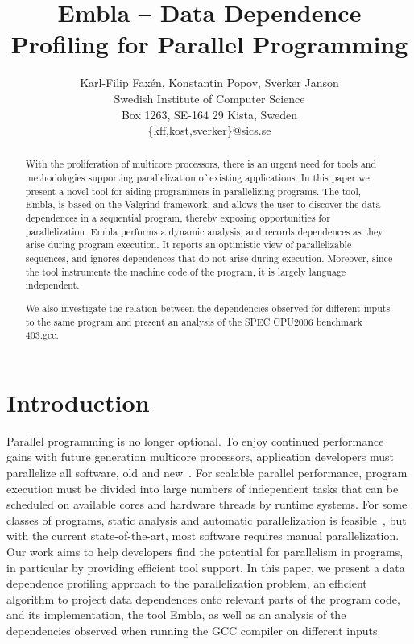 \documentclass[times, 10pt,twocolumn]{article}
\begin{document}
\title{Embla -- Data Dependence Profiling for Parallel Programming }
\author{Karl-Filip Fax\'en, Konstantin Popov, Sverker Janson\\
       Swedish Institute of Computer Science\\
       Box 1263, SE-164 29 Kista, Sweden\\
       \{kff,kost,sverker\}@sics.se}
\date{}
\maketitle

\begin{abstract}

With the proliferation of multicore processors, there is an urgent need for
tools and methodologies supporting parallelization of existing
applications.  In this paper we present a novel tool for aiding
programmers in parallelizing programs. The tool, Embla, is based on the
Valgrind framework, and allows the user to
discover the data dependences in a sequential program, thereby exposing
opportunities for parallelization.  Embla performs a dynamic analysis,
and records dependences as they
arise during program execution.  It reports an optimistic view of
parallelizable sequences, and ignores dependences that do not arise during
execution.  
Moreover, since the tool instruments the machine code of the program,
it is largely language independent. 

We also investigate the relation between the dependencies observed for 
different inputs to the same program and present an analysis of the 
SPEC CPU2006 benchmark 403.gcc.
\end{abstract}


\section{Introduction}

Parallel programming is no longer optional.  To enjoy continued
performance gains with future generation multicore processors,
application developers must parallelize all software, old and
new~\cite{TEL95,ONHWC96,KAB03,VIAVAC05}.  For scalable parallel
performance, program execution must be divided into large numbers of
independent tasks that can be scheduled on available cores and hardware
threads by runtime systems.  For some classes of programs, static
analysis and automatic parallelization is feasible~\cite{KA02}, but with
the current state-of-the-art, most software requires manual
parallelization.  Our work aims to help developers find the potential
for parallelism in programs, in particular by providing efficient tool
support.  In this paper, we present a data dependence profiling approach
to the parallelization problem, an efficient algorithm to project data
dependences onto relevant parts of the program code, and its
implementation, the tool Embla, as well as an analysis of the dependencies 
observed when running the GCC compiler on different inputs.
\end{document}
